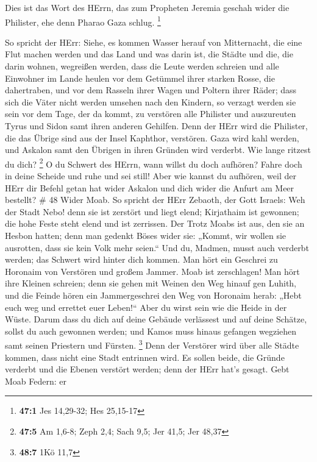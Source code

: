  Dies ist das Wort des HErrn, das zum Propheten Jeremia
geschah wider die Philister, ehe denn Pharao Gaza schlug. \footnote{\textbf{47:1}
  Jes 14,29-32; Hes 25,15-17}

 So spricht der HErr: Siehe, es kommen Wasser herauf von
Mitternacht, die eine Flut machen werden und das Land und was darin ist,
die Städte und die, die darin wohnen, wegreißen werden, dass die Leute
werden schreien und alle Einwohner im Lande heulen  vor dem
Getümmel ihrer starken Rosse, die dahertraben, und vor dem Rasseln ihrer
Wagen und Poltern ihrer Räder; dass sich die Väter nicht werden umsehen
nach den Kindern, so verzagt werden sie sein  vor dem Tage,
der da kommt, zu verstören alle Philister und auszureuten Tyrus und
Sidon samt ihren anderen Gehilfen. Denn der HErr wird die Philister, die
das Übrige sind aus der Insel Kaphthor, verstören.  Gaza
wird kahl werden, und Askalon samt den Übrigen in ihren Gründen wird
verderbt. Wie lange ritzest du dich? \footnote{\textbf{47:5} Am 1,6-8;
  Zeph 2,4; Sach 9,5; Jer 41,5; Jer 48,37}  O du Schwert des
HErrn, wann willst du doch aufhören? Fahre doch in deine Scheide und
ruhe und sei still!  Aber wie kannst du aufhören, weil der
HErr dir Befehl getan hat wider Askalon und dich wider die Anfurt am
Meer bestellt? \# 48  Wider Moab. So spricht der HErr
Zebaoth, der Gott Israels: Weh der Stadt Nebo! denn sie ist zerstört und
liegt elend; Kirjathaim ist gewonnen; die hohe Feste steht elend und ist
zerrissen.  Der Trotz Moabs ist aus, den sie an Hesbon
hatten; denn man gedenkt Böses wider sie: „Kommt, wir wollen sie
ausrotten, dass sie kein Volk mehr seien.`` Und du, Madmen, musst auch
verderbt werden; das Schwert wird hinter dich kommen.  Man
hört ein Geschrei zu Horonaim von Verstören und großem Jammer.
 Moab ist zerschlagen! Man hört ihre Kleinen schreien;
 denn sie gehen mit Weinen den Weg hinauf gen Luhith, und
die Feinde hören ein Jammergeschrei den Weg von Horonaim herab:
 „Hebt euch weg und errettet euer Leben!{}`` Aber du wirst
sein wie die Heide in der Wüste.  Darum dass du dich auf
deine Gebäude verlässest und auf deine Schätze, sollst du auch gewonnen
werden; und Kamos muss hinaus gefangen wegziehen samt seinen Priestern
und Fürsten. \footnote{\textbf{48:7} 1Kö 11,7}  Denn der
Verstörer wird über alle Städte kommen, dass nicht eine Stadt entrinnen
wird. Es sollen beide, die Gründe verderbt und die Ebenen verstört
werden; denn der HErr hat's gesagt.  Gebt Moab Federn: er
